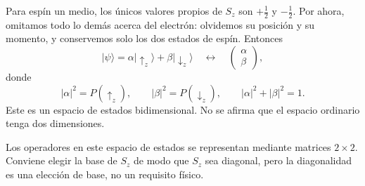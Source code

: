 Para espín un medio, los únicos valores propios de \(S_z\) son \(+\tfrac12\) y \(-\tfrac12\). Por ahora, omitamos todo lo demás acerca del electrón: olvidemos su posición y su momento, y conservemos solo los dos estados de espín. Entonces
\begin{equation}
|\psi\rangle
=
\alpha|\uparrow_z\rangle+\beta|\downarrow_z\rangle
\quad\longleftrightarrow\quad
\begin{pmatrix}
\alpha\\
\beta
\end{pmatrix},
\end{equation}
donde
\begin{equation}
|\alpha|^2=P(\uparrow_z),
\qquad
|\beta|^2=P(\downarrow_z),
\qquad
|\alpha|^2+|\beta|^2=1.
\end{equation}
Este es un espacio de estados bidimensional. No se afirma que el espacio ordinario tenga dos dimensiones.

\begin{classroomqa}
\end{classroomqa}

Los operadores en este espacio de estados se representan mediante matrices \(2\times2\). Conviene elegir la base de \(S_z\) de modo que \(S_z\) sea diagonal, pero la diagonalidad es una elección de base, no un requisito físico.

\begin{classroomqa}
\end{classroomqa}

\begin{classroomqa}
\end{classroomqa}

